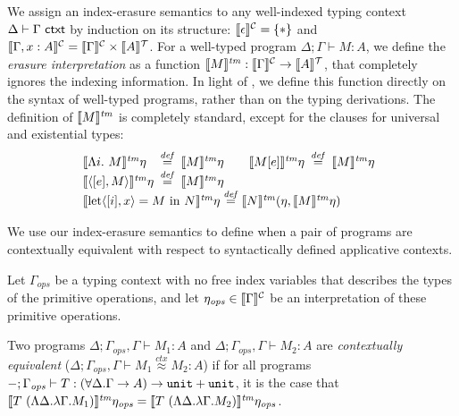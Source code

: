 We assign an index-erasure semantics to any well-indexed typing
context $\Delta \vdash \Gamma \textsf{ ctxt}$ by induction on its structure:
$\llbracket \epsilon \rrbracket^{\mathcal{C}} = \{*\}$ and $\llbracket \Gamma, x : A \rrbracket^{\mathcal{C}} =
\llbracket \Gamma \rrbracket^{\mathcal{C}} \times \llbracket A \rrbracket^{\mathcal{T}}$. For a well-typed program $\Delta;
\Gamma \vdash M : A$, we define the \emph{erasure interpretation} as a
function $\llbracket M \rrbracket^{\mathit{tm}} : \llbracket \Gamma \rrbracket^{\mathcal{C}} \to \llbracket A \rrbracket^{\mathcal{T}}$, that completely
ignores the indexing information. In light of
, we define this function directly on
the syntax of well-typed programs, rather than on the typing
derivations. The definition of $\llbracket M \rrbracket^{\mathit{tm}}$ is completely standard,
except for the clauses for universal and existential types:
\begin{displaymath}
  \begin{array}{@{}l}
    \begin{array}{@{}l@{\hspace{0.5em}}c@{\hspace{0.5em}}l@{\hspace{2em}}l@{\hspace{0.5em}}c@{\hspace{0.5em}}l@{}}
      \tmSem{\Lambda i.\ M}\eta & \isDefinedAs & \tmSem{M}\eta
      &
      \tmSem{M[e]}\eta & \isDefinedAs & \tmSem{M}\eta \\
      \tmSem{\langle [e], M\rangle}\eta & \isDefinedAs & \tmSem{M}\eta
    \end{array} \\
    \tmSem{\mathrm{let}\langle[i], x\rangle = M\ \mathrm{in}\ N}\eta \isDefinedAs \tmSem{N}(\eta, \tmSem{M}\eta)
  \end{array}
\end{displaymath}

We use our index-erasure semantics to define when a pair of programs
are contextually equivalent with respect to syntactically defined
applicative contexts.

\begin{definition}\label{defn:ctxt-equiv}
  Let $\Gamma_{\mathit{ops}}$ be a typing context with no free index
  variables that describes the types of the primitive operations, and
  let $\eta_{\mathit{ops}} \in \llbracket \Gamma \rrbracket^{\mathcal{C}}$ be an interpretation
  of these primitive operations.

  Two programs $\Delta; \Gamma_{\mathit{ops}}, \Gamma \vdash M_1 : A$
  and $\Delta; \Gamma_{\mathit{ops}}, \Gamma \vdash M_2 : A$ are
  \emph{contextually equivalent} ($\Delta; \Gamma_{\mathit{ops}},
  \Gamma \vdash M_1 \stackrel{ctx}\approx M_2 : A$) if for all
  programs $-;\Gamma_{\mathit{ops}} \vdash T : (\forall \Delta. \Gamma
  \to A) \to \textup{\texttt{unit}} + \textup{\texttt{unit}}$, it is the case that
  $\llbracket T\ (\Lambda \Delta. \lambda \Gamma. M_1) \rrbracket^{\mathit{tm}}\eta_{\mathit{ops}}
  = \llbracket T\ (\Lambda \Delta. \lambda
    \Gamma. M_2) \rrbracket^{\mathit{tm}}\eta_{\mathit{ops}}$.
\end{definition}

